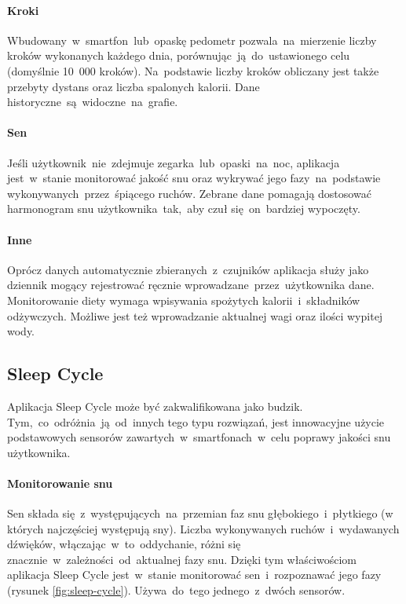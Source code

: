 \paragraph{Kroki} Wbudowany~w~smartfon~lub~opaskę pedometr pozwala~na~mierzenie liczby kroków wykonanych każdego dnia, porównując~ją~do~ustawionego celu (domyślnie 10~000 kroków). Na~podstawie liczby kroków obliczany jest także przebyty dystans oraz liczba spalonych kalorii. Dane historyczne~są~widoczne~na~grafie.

\paragraph{Sen} Jeśli użytkownik~nie~zdejmuje zegarka~lub~opaski~na~noc, aplikacja jest~w~stanie monitorować jakość snu oraz wykrywać jego fazy~na~podstawie wykonywanych~przez~śpiącego ruchów. Zebrane dane pomagają dostosować harmonogram snu użytkownika~tak,~aby czuł się~on~bardziej wypoczęty.

\paragraph{Inne} Oprócz danych automatycznie zbieranych~z~czujników aplikacja służy jako dziennik mogący rejestrować ręcznie wprowadzane~przez~użytkownika dane. Monitorowanie diety wymaga wpisywania spożytych kalorii~i~składników odżywczych. Możliwe jest też wprowadzanie aktualnej wagi oraz ilości wypitej wody. 

\subsection{Sleep Cycle}
\label{sec:sleep_cycle}
Aplikacja Sleep Cycle może być zakwalifikowana jako budzik. Tym,~co~odróżnia~ją~od~innych tego typu rozwiązań, jest innowacyjne użycie podstawowych sensorów zawartych~w~smartfonach~w~celu poprawy jakości snu użytkownika. 

\paragraph{Monitorowanie snu}
Sen składa się~z~występujących~na~przemian faz snu głębokiego~i~płytkiego (w których najczęściej występują sny). Liczba wykonywanych ruchów~i~wydawanych dźwięków, włączając~w~to~oddychanie, różni się znacznie~w~zależności~od~aktualnej fazy snu. Dzięki tym właściwościom aplikacja Sleep Cycle jest~w~stanie monitorować sen~i~rozpoznawać jego fazy (rysunek \ref{fig:sleep-cycle}). Używa~do~tego jednego~z~dwóch sensorów.

